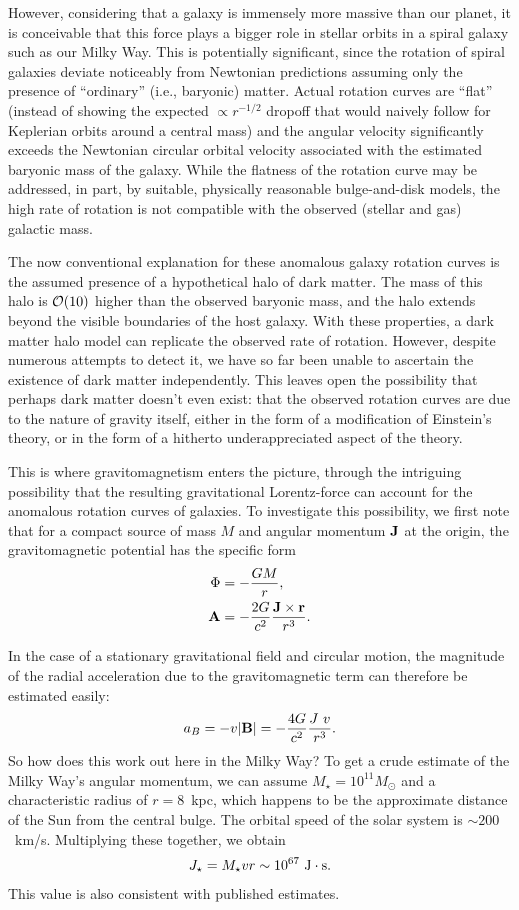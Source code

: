 \documentclass{ws-ijmpd}
\begin{document}
However, considering that a galaxy is immensely more massive than our planet, it is conceivable that this force plays a bigger role in stellar orbits in a spiral galaxy such as our Milky Way. This is potentially significant, since the rotation of spiral galaxies deviate noticeably from Newtonian predictions assuming only the presence of ``ordinary'' (i.e., baryonic) matter. Actual rotation curves are ``flat'' (instead of showing the expected $\propto r^{-1/2}$ dropoff that would naively follow for Keplerian orbits around a central mass) and the angular velocity significantly exceeds the Newtonian circular orbital velocity associated with the estimated baryonic mass of the galaxy. While the flatness of the rotation curve may be addressed, in part, by suitable, physically reasonable bulge-and-disk models, the high rate of rotation is not compatible with the observed (stellar and gas) galactic mass.

The now conventional explanation for these anomalous galaxy rotation curves is the assumed presence of a hypothetical halo of dark matter. The mass of this halo is ${\cal O}(10)$ higher than the observed baryonic mass, and the halo extends beyond the visible boundaries of the host galaxy. With these properties, a dark matter halo model can replicate the observed rate of rotation. However, despite numerous attempts to detect it, we have so far been unable to ascertain the existence of dark matter independently. This leaves open the possibility that perhaps dark matter doesn't even exist: that the observed rotation curves are due to the nature of gravity itself, either in the form of a modification of Einstein's theory, or in the form of a hitherto underappreciated aspect of the theory.

This is where gravitomagnetism enters the picture, through the intriguing possibility that the resulting gravitational Lorentz-force can account for the anomalous rotation curves of galaxies. To investigate this possibility, we first note that for a compact source of mass $M$ and angular momentum ${\bf J}$ at the origin, the gravitomagnetic potential has the specific form
\begin{align}
\Phi&=-\frac{GM}{r},\\
{\bf A}&=-\frac{2G}{c^2}\frac{{\bf J}\times{\bf r}}{r^3}.
\end{align}

In the case of a stationary gravitational field and circular motion, the magnitude of the radial acceleration due to the gravitomagnetic term can therefore be estimated easily:
\begin{align}
a_B=-v|{\bf B}|=-\frac{4G}{c^2}\frac{J~v}{r^3}.
\end{align}
So how does this work out here in the Milky Way? To get a crude estimate of the Milky Way's angular momentum, we can assume $M_\star=10^{11}M_\odot$ and a characteristic radius of $r=8$~kpc, which happens to be the approximate distance of the Sun from the central bulge. The orbital speed of the solar system is $\sim 200$~km/s. Multiplying these together, we obtain
\begin{align}
J_\star=M_\star vr\sim 10^{67}~{\rm J}\cdot{\rm s}.
\end{align}
This value is also consistent with published estimates.
\end{document}
